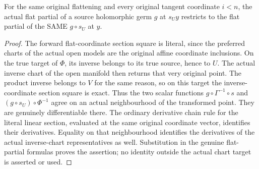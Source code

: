 \begin{lemma}
\label{hir:actual-open-zero-section-flat-partials}
\leanok
For the same original flattening and every original tangent coordinate $i<n$, the actual flat partial of a source holomorphic germ $g$ at $s_Uy$ restricts to the flat partial of the SAME $g\circ s_U$ at $y$.
\end{lemma}
\begin{proof}
The forward flat-coordinate section square is literal, since the preferred charts of the actual open models are the original affine coordinate inclusions. On the true target of $\Phi$, its inverse belongs to its true source, hence to $U$. The actual inverse chart of the open manifold then returns that very original point. The product inverse belongs to $V$ for the same reason, so on this target the inverse-coordinate section square is exact. Thus the two scalar functions $g\circ\Gamma^{-1}\circ s$ and $(g\circ s_U)\circ\Phi^{-1}$ agree on an actual neighbourhood of the transformed point. They are genuinely differentiable there. The ordinary derivative chain rule for the literal linear section, evaluated at the same original coordinate vector, identifies their derivatives. Equality on that neighbourhood identifies the derivatives of the actual inverse-chart representatives as well. Substitution in the genuine flat-partial formulas proves the assertion; no identity outside the actual chart target is asserted or used.
\end{proof}

